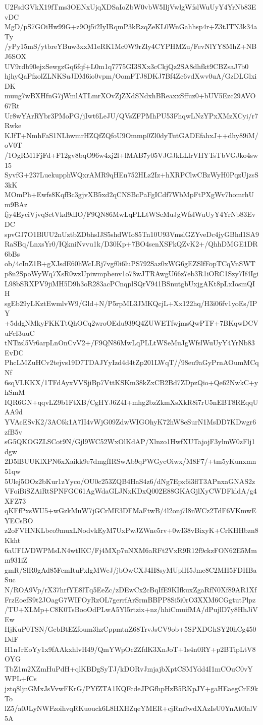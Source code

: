U2FsdGVkX19fTms3OENxUjqXDSaIoZbW0vbW5IljVwlgWfslWuUyY4YrNb83EvDC
MgD/pS7GOiHw99G+z9Oj5i2IyIRqmP3kRzqZeKL0WnGahhsp4r+Z3tJTN3k34aTy
/yPy15mS/ytbreYBuw3xxM1eRK1Mc0W9rZly4CYPHMZu/FevNlYY8MhZ+NBJ6SOX
UV9rdb90ejxSewgzGq6fqf+L0m1q7775GI3SXx3cCkjQz2SA8dhfkt9CBZsaJ7b0
hjhyQaPfzolZLNKSuJDM6io0vpm/OomFTJ8DKJ7Bf4Zc6vdXwv0uA/GzDLGlxiDK
muug7wBXHfnG7jWmlATLmrXOvZjZXdSNdxhBReaxxSffuz0+bUV5Ezc29AVO67Rt
Ur8wYArRYbr3PMoPG/jIwt6LeJU/QVsZFPMhPU53FhqwLNzYPxXMzXCyi/r7Rwke
KJfT+NmhFaS1NLhwmrHZQfZQfoU9Ommp0Zl0dyTutGADEfahxJ++dhy89iM/oV0T
/1OgRM1FjFd+F12gv8bqO96w4xj2l+lMAB7y05VJGJkLLlrVHYTsTbVGJko4sw15
SyvfG+237LuekupphWQxrAMR9qHEn752HLz2Iz+hXRPClwCBzWyH0PqzUjzsS3kK
MOmPh+Ewfs8KqfBc3gjvXB5xd2qCNSBcPaFgICdf7WbMpFtPXgWv7homrhUm9BAz
fjy4EyciVjvqSctVkd9dIO/F9QN86MwLqPLLtWSeMuJgWfslWuUyY4YrNb83EvDC
spvGJ7O1BlUU2nUztbZDbhsIJS5shdWIo85Tn10U93VmslGZYveDc4jyGBhd1SA9
RaSBq/LnxsYr0/IQkniNvvu1k/D30Kp+7BO4senXSFkQZvK2+/QhhDMGE1DR6bBs
ob/4cInZ1B+gXJsdE60hWcLRj7vgf0i6luPS792Saz0xWG6gEZSlfFopTCqVnSWT
p8n2SpoWyWq7XsR0wzUpiwmpbenv1o78wJTRAwgU66z7eb3R1iORC1Szy7If4Igi
L98bSRXPV9jiMH5D9h3oR283acPCnqplSQrV941BSnutgbUxjgAKt8pLxIosmQIH
sgEb29yLKztEwmlvW9/Gld+N/P5rpML3JMKQcjL+Xx122hq/H3i06fv1yoEs/IPY
+5ddgNMkyFKKTtQhOCq2wroOEdu939Q4ZUWETfwjmsQwPTF+7BKqwDCVuFcI3uuC
tNTzsl5Vr6arpLnOnCvV2+/F9QN86MwLqPLLtWSeMuJgWfslWuUyY4YrNb83EvDC
PhcLMZuHCv2tejvs19D7TDAJYyIzd4d4tZp201LWqT//98eu9aGyPrnAOumMCqNf
6sqVLKKX/1TFdAyxVVSjiBp7VttKSKm38kZxCB2Bd7ZDpzQio+Qe62NwkC+yhSmM
IQR6GN+qqvLZ9b1FtXB/CgHYJ6Z4I+mhg2bzZkmXsXkR8i7rU5nEBT8REqqUAA9d
YVAcESvK2/3AC6k1A7II4vWjG09ZdwWIGOhyK72hW8eSurN1MsDD7KDwgr6zfB5v
sG5QKOGZLSCot9N/Gjl9WC52WxOlKdAP/Xlnzo1HwfXUTajojF3ylmW0zFlj1dgw
2D5lBUUKlXPN6xXaikk9e7dmgfIRSwAb9qPWGycOiwx/M8F7/+tm5yKunxmn51qw
5Ulej5OOz2bKur1zYyco/OU0c253ZQB4HaS4z6/dNg7Epx6i3flT3APnxaGNAS2z
VFoiBiSZAiRtSPNFGC61AgWdaGLJNxKDxQ002E88GKAGjlXyCWDFkldA/g4XFZ73
qKFfPxsWU5+wGzkMuW7jGCrME3DFMaFtwB/4l2onj7l8nWCz2TdF6VKmwEYECsBO
z2oFVHNKLbco9muxLNodvkEyM7UxPwJZWne5rv+0wI38vBixyK+CrKHHbzn8Kkht
6aUFLVDWPMsLN4wtIKC/Fj4MXp7uNXM6aRFt2VxR9R12f9ckzFON62E5Mmm931iZ
gmR/SlR0gAd85FcmItuFxlgMWeJ/jbOwCXJ4II8syMUplH5Jme8C2MH5FDHBaSuc
N/ROA9Vp/rX37hrfYE8lTq5EeZc/zDEwCx2cBqIfE9KIfkuxZgaRfN0Xf89AR1Xf
FrzEoefS9t2JOagG7WIFOyRzOL7gerrfArSrmBBPP8Si5i0rO3XXM6CGgtutPlpz
/TU+XLMp+C8K0TsBooOdPLwA5Yl5rtzix+nz/hhiCmuifMA/dPujlD7y8HhJiVEw
HjKuP0TSN/GebBtEZfoum3hzCppmtnZ68TrvJsCV9ob+5SPXDGhSY20hCg450DdF
H1nJrEoYy1x9fAAkxhlvH49/QmYWpOc2ZfdK3XnJoT+1s4n0RY+p2BTipLtV8OYG
TbZ1m2XZmHuPdH+qlKBDgSyTJ/kDORvJmjajbXptCSMYdd4I1mCOuC0vYWPL+fCs
jztq8ljnGMxJsVvwFKrG/PYfZTA1KQFcdeJPGfhpHzB5RKpJY+gaHEaegCrE9kTo
lZ5/a0JLyNWFzoihvqRKuouck6L8HXHZqeYMER+cjRm9wdXAzIsU0YnAt0lalV5A
